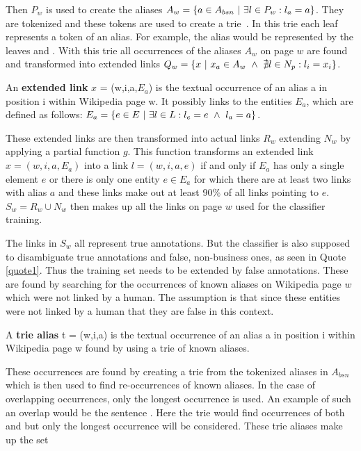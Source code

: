 Then $P_w$ is used to create the aliases $A_w = \{a \in A_{bsn} {\mbox{ }|\mbox{ }} \exists l \in P_w: l_a = a \}$. They are tokenized and these tokens are used to create a trie\ \cite{Fredkin:1960:TM:367390.367400}. In this trie each leaf represents a token of an alias. For example, the alias  would be represented by the leaves  and . With this trie all occurrences of the aliases $A_w$ on page $w$ are found and transformed into extended links $Q_w = \{ x {\mbox{ }|\mbox{ }} x_a \in A_w {\mbox{ }\wedge\mbox{ }} \nexists l \in N_p: l_i = x_i \}$.\par
\begin{definition}
An \textbf{extended link} $x$ = (w,i,a,$E_a$) is the textual occurrence of an alias a in position i within Wikipedia page w. It possibly links to the entities $E_a$, which are defined as follows: $E_a = \{ e \in E {\mbox{ }|\mbox{ }} \exists l \in L: l_e = e {\mbox{ }\wedge\mbox{ }} l_a = a \}$.
\label{extendedlink}
\end{definition}
These extended links are then transformed into actual links $R_w$ extending $N_w$ by applying a partial function $g$.
This function transforms an extended link $x = (w,i,a,E_a)$ into a link $l = (w,i,a,e)$ if and only if $E_a$ has only a single element $e$ or there is only one entity $e \in E_a$ for which there are at least two links with alias $a$ and these links make out at least 90\% of all links pointing to $e$. $S_w = R_w \cup N_w$ then makes up all the links on page $w$ used for the classifier training.\par
The links in $S_w$ all represent true annotations. But the classifier is also supposed to disambiguate true annotations and false, non-business ones, as seen in Quote \ref{quote1}. Thus the training set needs to be extended by false annotations. These are found by searching for the occurrences of known aliases on Wikipedia page $w$ which were not linked by a human. The assumption is that since these entities were not linked by a human that they are false in this context.
\begin{definition}
A \textbf{trie alias} t = (w,i,a) is the textual occurrence of an alias a in position i within Wikipedia page w found by using a trie of known aliases.
\label{triealias}
\end{definition}
These occurrences are found by creating a trie from the tokenized aliases in $A_{bsn}$ which is then used to find re-occurrences of known aliases. In the case of overlapping occurrences, only the longest occurrence is used. An example of such an overlap would be the sentence . Here the trie would find occurrences of both  and  but only the longest occurrence will be considered. These trie aliases make up the set
